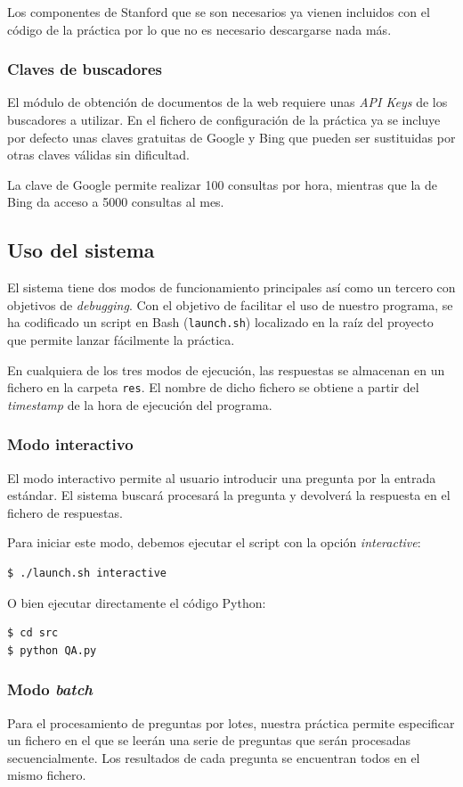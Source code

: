 \documentclass[12pt,a4paper,titlepage]{article}
\begin{document}
Los componentes de Stanford que se son necesarios ya vienen incluidos con el código de la práctica por lo que no es necesario descargarse nada más.

\subsubsection{Claves de buscadores}
El módulo de obtención de documentos de la web requiere unas \emph{API Keys} de los buscadores a utilizar. En el fichero de configuración de la práctica ya se incluye por defecto unas claves gratuitas de Google y Bing que pueden ser sustituidas por otras claves válidas sin dificultad.

La clave de Google permite realizar 100 consultas por hora, mientras que la de Bing da acceso a 5000 consultas al mes.


\subsection{Uso del sistema}
El sistema tiene dos modos de funcionamiento principales así como un tercero con objetivos de \emph{debugging}. Con el objetivo de facilitar el uso de nuestro programa, se ha codificado un script en Bash (\texttt{launch.sh}) localizado en la raíz del proyecto que permite lanzar fácilmente la práctica.

En cualquiera de los tres modos de ejecución, las respuestas se almacenan en un fichero en la carpeta \texttt{res}. El nombre de dicho fichero se obtiene a partir del \emph{timestamp} de la hora de ejecución del programa.

\subsubsection{Modo interactivo}
El modo interactivo permite al usuario introducir una pregunta por la entrada estándar. El sistema buscará procesará la pregunta y devolverá la respuesta en el fichero de respuestas.

Para iniciar este modo, debemos ejecutar el script con la opción \emph{interactive}:
\begin{lstlisting}
$ ./launch.sh interactive
\end{lstlisting}

O bien ejecutar directamente el código Python:
\begin{lstlisting}
$ cd src
$ python QA.py
\end{lstlisting}

\subsubsection{Modo \emph{batch}}
Para el procesamiento de preguntas por lotes, nuestra práctica permite especificar un fichero en el que se leerán una serie de preguntas que serán procesadas secuencialmente. Los resultados de cada pregunta se encuentran todos en el mismo fichero.
\end{document}
